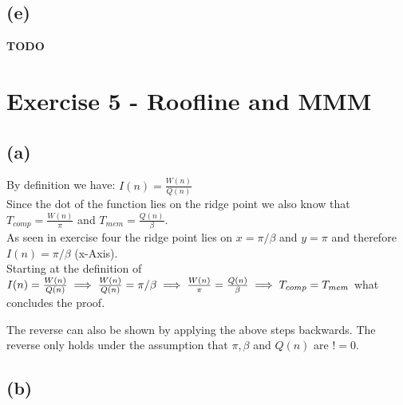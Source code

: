 \documentclass[10pt,a4paper,oneside,notitlepage]{report}
\begin{document}
\subsection*{(e)}
\textbf{TODO}

\section*{Exercise 5 - Roofline and MMM}
\subsection*{(a)}
By definition we have: 
$I(n)=\frac{W(n)}{Q(n)}$ \\
Since the dot of the function lies on the ridge point we also know that
$T_{comp} = \frac{W(n)}{\pi}$  and
$T_{mem} = \frac{Q(n)}{\beta}$. \\
As seen in exercise four the ridge point lies on $x=\pi/\beta$ and $y=\pi$ and therefore $I(n)=\pi/\beta$ (x-Axis). \\
Starting at the definition of \\
$I(n)=\frac{W(n)}{Q(n)} \\
 \implies \frac{W(n)}{Q(n)} = \pi/\beta \\
  \implies \frac{W(n)}{\pi} = \frac{Q(n)}{\beta}\\
  \implies T_{comp} = T_{mem}$ what concludes the proof.

The reverse can also be shown by applying the above steps backwards. The reverse only holds under the assumption that $\pi, \beta$ and $Q(n)$ are $!=0$.
\subsection*{(b)}
\end{document}
